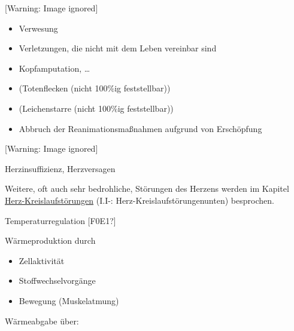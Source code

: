 \documentclass{article}
\begin{document}
\begin{center}
 [Warning: Image ignored] %

\end{center}
\begin{itemize}
\item {\mdseries
%
%
Verwesung}

\item {\mdseries
Verletzungen, die nicht mit dem Leben  vereinbar sind}

\end{itemize}
\begin{itemize}
\item {\mdseries
Kopfamputation, {\dots}}

\end{itemize}
\begin{itemize}
\item {\mdseries
(Totenflecken (nicht 100\%ig feststellbar))}

\item {\mdseries
(Leichenstarre (nicht 100\%ig feststellbar))}

\item {\mdseries
Abbruch der Reanimationsma{\ss}nahmen aufgrund von Ersch\"opfung}

\end{itemize}


\begin{center}
 [Warning: Image ignored] %

\end{center}
{\mdseries\color[rgb]{0.0,0.0,0.5019608}
Herzinsuffizienz, Herzversagen}

{\mdseries
Weitere, oft auch sehr bedrohliche, St\"orungen des Herzens werden im
Kapitel 
\hyperlink{a84HerzKreislaufstrungenoutline}{Herz-Kreislaufst\"orungen} 
(I.I{}-\pageref{bkm:RefHeading42342802}:
{\quotedblbase}Herz-Kreislaufst\"orungenunten{\quotedblbase})
besprochen.}

{\mdseries\color[rgb]{0.0,0.0,0.5019608}
Temperaturregulation [F0E1?]}

{\mdseries
W\"armeproduktion durch}

\begin{itemize}
\item {\mdseries
Zellaktivit\"at}

\item {\mdseries
Stoffwechselvorg\"ange}

\item {\mdseries
Bewegung (Muskelatmung)}

\end{itemize}
{\mdseries
W\"armeabgabe \"uber:}
\end{document}
